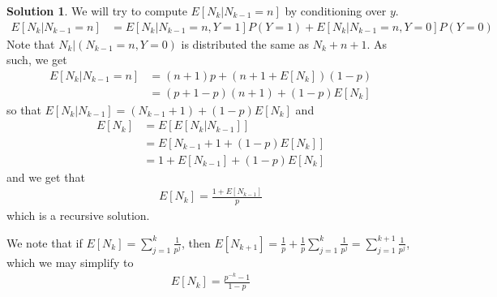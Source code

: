 \documentclass[11pt]{amsart}
\theoremstyle{definition}
\newtheorem{solution}[theorem]{Solution}
\numberwithin{equation}{section}
\begin{document}
\begin{solution}
     We will try to compute $E[N_k|{N_{k-1}=n}]$ by conditioning over $y$.
     \begin{align*}
         E[N_k|N_{k-1}=n]&=E[N_k|N_{k-1}=n, Y=1]P(Y=1)+E[N_k|N_{k-1}=n, Y=0]P(Y=0)
     \end{align*}
     Note that $N_k|(N_{k-1}=n, Y=0)$ is distributed the same as $N_k+n+1$. As such, we get
     \begin{align*}
         E[N_k|N_{k-1}=n]&=(n+1)p+(n+1+E[N_k])(1-p)\\
         &=(p+1-p)(n+1)+(1-p)E[N_k]
     \end{align*}
     so that $E[N_k|N_{k-1}]=(N_{k-1}+1)+(1-p)E[N_k]$ and
     \begin{align*}
         E[N_k]&=
         E[E[N_k|N_{k-1}]]\\
         &=E[N_{k-1}+1+(1-p)E[N_k]]\\
         &=1+E[N_{k-1}]+(1-p)E[N_k]
     \end{align*}
     and we get that
     \begin{align*}
         E[N_k]=\frac{1+E[N_{k-1}]}{p}
     \end{align*}
     which is a recursive solution.

     We note that if $E[N_k]=\sum_{j=1}^k\frac{1}{p^j}$, then $E[N_{k+1}]=\frac{1}{p}+\frac{1}{p}\sum_{j=1}^k\frac{1}{p^j}=\sum_{j=1}^{k+1}\frac{1}{p^j}$, which we may simplify to
     \begin{align*}
         E[N_k]=\frac{p^{-k}-1}{1-p}
     \end{align*}
 \end{solution}
\end{document}
